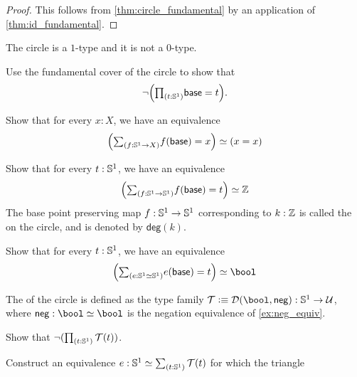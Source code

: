 \begin{proof}
This follows from \cref{thm:circle_fundamental} by an application of \cref{thm:id_fundamental}.
\end{proof}

\begin{cor}
The circle is a $1$-type and it is not a $0$-type.
\end{cor}

\begin{exercises}
\item Use the fundamental cover of the circle to show that
\begin{equation*}
\neg\Big(\prd{t:\sphere{1}}\base=t\Big).
\end{equation*}
\item \label{ex:circle_degk}
\begin{subexenum}
\item Show that for every $x:X$, we have an equivalence
\begin{equation*}
\eqv{\Big(\sm{f:\sphere{1}\to X}f(\base)= x \Big)}{(x=x)}
\end{equation*}
\item Show that for every $t:\mathbb{S}^{1}$, we have an equivalence
\begin{equation*}
\eqv{\Big(\sm{f:\sphere{1}\to \sphere{1}}f(\base)= t \Big)}{\Z}
\end{equation*}
The base point preserving map $f:\mathbb{S}^{1}\to\mathbb{S}^{1}$ corresponding to $k:\mathbb{Z}$ is called the  on the circle, and is denoted by $\mathsf{deg}(k)$.
\item Show that for every $t:\mathbb{S}^{1}$, we have an equivalence
\begin{equation*}
\eqv{\Big(\sm{e:\eqv{\sphere{1}}{\sphere{1}}}e(\base)= t \Big)}{\bool}
\end{equation*}
\end{subexenum}
\item \label{ex:circle_double_cover} The  of the circle is defined as the type family $\mathcal{T}\defeq\mathcal{D}(\bool,\mathsf{neg}):\sphere{1}\to\UU$, where $\mathsf{neg}:\eqv{\bool}{\bool}$ is the negation equivalence of \autoref{ex:neg_equiv}.
\begin{subexenum}
\item Show that $\neg(\prd{t:\sphere{1}}\mathcal{T}(t))$.
\item Construct an equivalence $e:\eqv{\sphere{1}}{\sm{t:\sphere{1}}\mathcal{T}(t)}$ for which the triangle

\end{subexenum}
\end{exercises}
